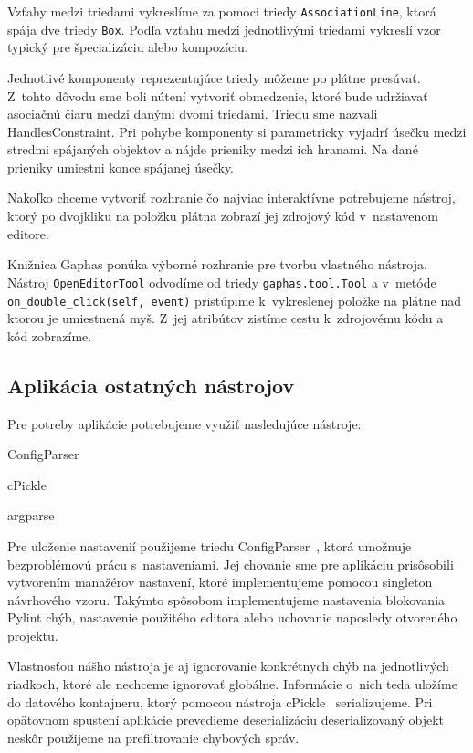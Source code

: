 \documentclass[11pt,oneside,final]{fithesis2}
\begin{document}
		Vzťahy medzi triedami vykreslíme za pomoci triedy \texttt{AssociationLine}, ktorá spája dve triedy \texttt{Box}. Podľa vzťahu medzi jednotlivými triedami vykreslí vzor typický pre špecializáciu alebo kompozíciu.
		
		Jednotlivé komponenty reprezentujúce triedy môžeme po plátne presúvať. Z~tohto dôvodu sme boli nútení vytvoriť obmedzenie, ktoré bude udržiavať asociačnú čiaru medzi danými dvomi triedami. Triedu sme nazvali HandlesConstraint. Pri pohybe komponenty si parametricky vyjadrí úsečku medzi stredmi spájaných objektov a nájde prieniky medzi ich hranami. Na dané prieniky umiestni konce spájanej úsečky.
		
		Nakoľko chceme vytvoriť rozhranie čo najviac interaktívne potrebujeme nástroj, ktorý po dvojkliku na položku plátna zobrazí jej zdrojový kód v~nastavenom editore.
		
		Knižnica Gaphas ponúka výborné rozhranie pre tvorbu vlastného nástroja. Nástroj \texttt{OpenEditorTool} odvodíme od triedy \texttt{gaphas.tool.Tool} a v~metóde \texttt{on\_double\_click(self, event)} pristúpime k~vykreslenej položke na plátne nad ktorou je umiestnená myš. Z~jej atribútov zistíme cestu k~zdrojovému kódu a kód zobrazíme.

		\subsection{Aplikácia ostatných nástrojov}
		
	Pre potreby aplikácie potrebujeme využiť nasledujúce nástroje:
	
				\begin{list}{•}{}
					\item ConfigParser
					\item cPickle
					\item argparse
    			\end{list}
	
	 Pre uloženie nastavenií použijeme triedu ConfigParser~\cite{configparser}, ktorá umožnuje bezproblémovú prácu s~nastaveniami. Jej chovanie sme pre aplikáciu prisôsobili vytvorením manažérov nastavení, ktoré implementujeme pomocou singleton návrhového vzoru. Takýmto spôsobom implementujeme nastavenia blokovania Pylint chýb, nastavenie použitého editora alebo uchovanie naposledy otvoreného projektu.
	
	Vlastnosťou nášho nástroja je aj ignorovanie konkrétnych chýb na jednotlivých riadkoch, ktoré ale nechceme ignorovať globálne. Informácie o~nich teda uložíme do datového kontajneru, ktorý pomocou nástroja cPickle~\cite{cpickle} serializujeme. Pri opätovnom spustení aplikácie prevedieme deserializáciu deserializovaný objekt neskôr použijeme na prefiltrovanie chybových správ.
	
\end{document}
